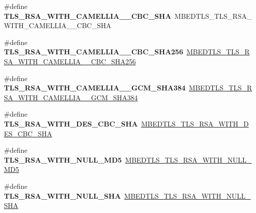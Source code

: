 \begin{DoxyCompactItemize}
\item 
\mbox{\label{compat-1_83_8h_a774157bfc8458b05d824d7daaee77fd9}} 
\#define {\bfseries T\+L\+S\+\_\+\+R\+S\+A\+\_\+\+W\+I\+T\+H\+\_\+\+C\+A\+M\+E\+L\+L\+I\+A\+\_\+\_\+\+C\+B\+C\+\_\+\+S\+HA}~M\+B\+E\+D\+T\+L\+S\+\_\+\+T\+L\+S\+\_\+\+R\+S\+A\+\_\+\+W\+I\+T\+H\+\_\+\+C\+A\+M\+E\+L\+L\+I\+A\+\_\+\_\+\+C\+B\+C\+\_\+\+S\+HA
\item 
\mbox{\label{compat-1_83_8h_a2f0a30925335e5a19031ca373b06d203}} 
\#define {\bfseries T\+L\+S\+\_\+\+R\+S\+A\+\_\+\+W\+I\+T\+H\+\_\+\+C\+A\+M\+E\+L\+L\+I\+A\+\_\+\_\+\+C\+B\+C\+\_\+\+S\+H\+A256}~\mbox{\hyperlink{ssl__ciphersuites_8h_a42c937825e6b46fd44c6d00d17f56506}{M\+B\+E\+D\+T\+L\+S\+\_\+\+T\+L\+S\+\_\+\+R\+S\+A\+\_\+\+W\+I\+T\+H\+\_\+\+C\+A\+M\+E\+L\+L\+I\+A\+\_\+\_\+\+C\+B\+C\+\_\+\+S\+H\+A256}}
\item 
\mbox{\label{compat-1_83_8h_a42181f221d3388b83683bf2c5ae7817b}} 
\#define {\bfseries T\+L\+S\+\_\+\+R\+S\+A\+\_\+\+W\+I\+T\+H\+\_\+\+C\+A\+M\+E\+L\+L\+I\+A\+\_\+\_\+\+G\+C\+M\+\_\+\+S\+H\+A384}~\mbox{\hyperlink{ssl__ciphersuites_8h_af70c7bcb65f88c35736c908b17f0b50e}{M\+B\+E\+D\+T\+L\+S\+\_\+\+T\+L\+S\+\_\+\+R\+S\+A\+\_\+\+W\+I\+T\+H\+\_\+\+C\+A\+M\+E\+L\+L\+I\+A\+\_\+\_\+\+G\+C\+M\+\_\+\+S\+H\+A384}}
\item 
\mbox{\label{compat-1_83_8h_a77965fee468e98b2e5392a7a2d8267dc}} 
\#define {\bfseries T\+L\+S\+\_\+\+R\+S\+A\+\_\+\+W\+I\+T\+H\+\_\+\+D\+E\+S\+\_\+\+C\+B\+C\+\_\+\+S\+HA}~\mbox{\hyperlink{ssl__ciphersuites_8h_a0bc0aa3876b0641040b9b33a8453386d}{M\+B\+E\+D\+T\+L\+S\+\_\+\+T\+L\+S\+\_\+\+R\+S\+A\+\_\+\+W\+I\+T\+H\+\_\+\+D\+E\+S\+\_\+\+C\+B\+C\+\_\+\+S\+HA}}
\item 
\mbox{\label{compat-1_83_8h_a2b7974fbefcbd84e79eb861e349dda79}} 
\#define {\bfseries T\+L\+S\+\_\+\+R\+S\+A\+\_\+\+W\+I\+T\+H\+\_\+\+N\+U\+L\+L\+\_\+\+M\+D5}~\mbox{\hyperlink{ssl__ciphersuites_8h_af584d987ca8d2fbd8634bb2ec4a29a76}{M\+B\+E\+D\+T\+L\+S\+\_\+\+T\+L\+S\+\_\+\+R\+S\+A\+\_\+\+W\+I\+T\+H\+\_\+\+N\+U\+L\+L\+\_\+\+M\+D5}}
\item 
\mbox{\label{compat-1_83_8h_aa0fa765ca865efb1dcb16a7934499e55}} 
\#define {\bfseries T\+L\+S\+\_\+\+R\+S\+A\+\_\+\+W\+I\+T\+H\+\_\+\+N\+U\+L\+L\+\_\+\+S\+HA}~\mbox{\hyperlink{ssl__ciphersuites_8h_a19b23eeb8a05be325878ca1a4f74c372}{M\+B\+E\+D\+T\+L\+S\+\_\+\+T\+L\+S\+\_\+\+R\+S\+A\+\_\+\+W\+I\+T\+H\+\_\+\+N\+U\+L\+L\+\_\+\+S\+HA}}

\end{DoxyCompactItemize}
